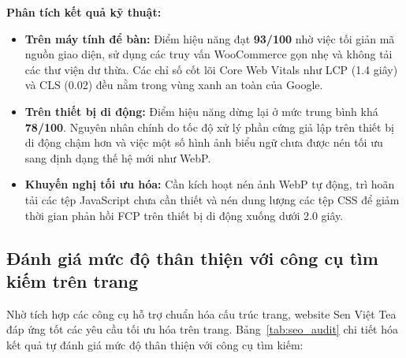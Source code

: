\textbf{Phân tích kết quả kỹ thuật:}
\begin{itemize}
    \item \textbf{Trên máy tính để bàn:} Điểm hiệu năng đạt \textbf{93/100} nhờ việc tối giản mã nguồn giao diện, sử dụng các truy vấn WooCommerce gọn nhẹ và không tải các thư viện dư thừa. Các chỉ số cốt lõi Core Web Vitals như LCP (1.4 giây) và CLS (0.02) đều nằm trong vùng xanh an toàn của Google.
    \item \textbf{Trên thiết bị di động:} Điểm hiệu năng dừng lại ở mức trung bình khá \textbf{78/100}. Nguyên nhân chính do tốc độ xử lý phần cứng giả lập trên thiết bị di động chậm hơn và việc một số hình ảnh biểu ngữ chưa được nén tối ưu sang định dạng thế hệ mới như WebP. 
    \item \textbf{Khuyến nghị tối ưu hóa:} Cần kích hoạt nén ảnh WebP tự động, trì hoãn tải các tệp JavaScript chưa cần thiết và nén dung lượng các tệp CSS để giảm thời gian phản hồi FCP trên thiết bị di động xuống dưới 2.0 giây.
\end{itemize}

\subsection{Đánh giá mức độ thân thiện với công cụ tìm kiếm trên trang}

Nhờ tích hợp các công cụ hỗ trợ chuẩn hóa cấu trúc trang, website Sen Việt Tea đáp ứng tốt các yêu cầu tối ưu hóa trên trang. Bảng~\ref{tab:seo_audit} chi tiết hóa kết quả tự đánh giá mức độ thân thiện với công cụ tìm kiếm:

